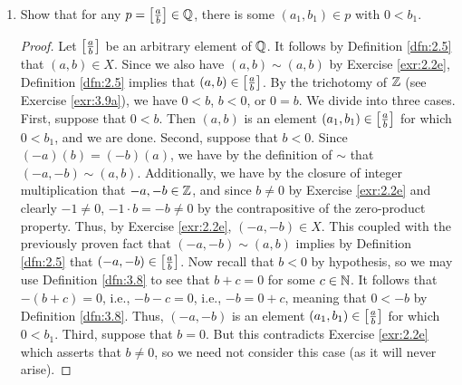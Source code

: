 \documentclass[../main.tex]{subfiles}
\begin{document}
\begin{exercise}
\begin{enumerate}[label={\alph*)},ref={\thetheorem\alph*}]
\begin{proof}
            To prove that $<$ is transitive, it will suffice to show that for all $x,y,z\in\Z$, if $x<y$ and $y<z$, then $x<z$. Let $x,y,z$ be arbitrary elements of $\Z$ for which it is true that $x<y$ and $y<z$. By Definition \ref{dfn:3.8}, we have $y=x+c$ and $z=y+c'$ for some $c,c'\in\N$. Substituting, we have $z=x+c+c'$. Since $(c+c')\in\N$ by the closure of addition on $\N$, Definition \ref{dfn:3.8} implies that $x<z$.\par\medskip
            Axiom \ref{axm:3.3} asserts that $\Z$ must have no first or last point. Suppose for the sake of contradiction that $\Z$ has some first point $a$. Then by Definition \ref{dfn:3.3}, $a\leq x$ for every $x\in\Z$. However, under the closure of subtraction on $\Z$, $(a-1)\in\Z$. Since $(a-1)+1=a$, Definition \ref{dfn:3.8} asserts that $a-1<a$. Therefore, we have $a-1<a$ and $a\leq a-1$ (since, again, $(a-1)\in\Z$), contradicting the previously demonstrated fact that $<$ is an ordering. The proof is symmetric for the last point.
        \end{proof}
        \item \label{exr:3.9b}Show that for any $p=\left[ \frac{a}{b} \right]\in\mathbb{Q}$, there is some $(a_1,b_1)\in p$ with $0<b_1$.
        \begin{proof}
            Let $\left[ \frac{a}{b} \right]$ be an arbitrary element of $\mathbb{Q}$. It follows by Definition \ref{dfn:2.5} that $(a,b)\in X$. Since we also have $(a,b)\sim(a,b)$ by Exercise \ref{exr:2.2e}, Definition \ref{dfn:2.5} implies that $(a,b)\in\left[ \frac{a}{b} \right]$. By the trichotomy of $\Z$ (see Exercise \ref{exr:3.9a}), we have $0<b$, $b<0$, or $0=b$. We divide into three cases. First, suppose that $0<b$. Then $(a,b)$ is an element $(a_1,b_1)\in\left[ \frac{a}{b} \right]$ for which $0<b_1$, and we are done. Second, suppose that $b<0$. Since $(-a)(b)=(-b)(a)$, we have by the definition of $\sim$ that $(-a,-b)\sim(a,b)$. Additionally, we have by the closure of integer multiplication that $-a,-b\in\mathbb{Z}$, and since $b\neq 0$ by Exercise \ref{exr:2.2e} and clearly $-1\neq 0$, $-1\cdot b=-b\neq 0$ by the contrapositive of the zero-product property. Thus, by Exercise \ref{exr:2.2e}, $(-a,-b)\in X$. This coupled with the previously proven fact that $(-a,-b)\sim(a,b)$ implies by Definition \ref{dfn:2.5} that $(-a,-b)\in\left[ \frac{a}{b} \right]$. Now recall that $b<0$ by hypothesis, so we may use Definition \ref{dfn:3.8} to see that $b+c=0$ for some $c\in\mathbb{N}$. It follows that $-(b+c)=0$, i.e., $-b-c=0$, i.e., $-b=0+c$, meaning that $0<-b$ by Definition \ref{dfn:3.8}. Thus, $(-a,-b)$ is an element $(a_1,b_1)\in\left[ \frac{a}{b} \right]$ for which $0<b_1$. Third, suppose that $b=0$. But this contradicts Exercise \ref{exr:2.2e} which asserts that $b\neq 0$, so we need not consider this case (as it will never arise).

\end{proof}
\end{enumerate}
\end{exercise}
\end{document}
